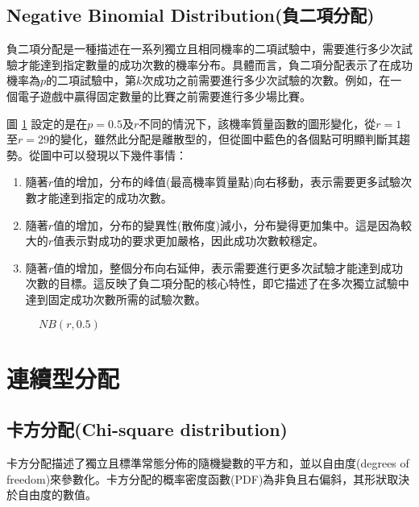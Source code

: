 \documentclass[12pt, a4paper]{article}
\begin{document}
\subsection{Negative Binomial Distribution(負二項分配)}
負二項分配是一種描述在一系列獨立且相同機率的二項試驗中，需要進行多少次試驗才能達到指定數量的成功次數的機率分布。具體而言，負二項分配表示了在成功機率為$p$的二項試驗中，第$k$次成功之前需要進行多少次試驗的次數。例如，在一個電子遊戲中贏得固定數量的比賽之前需要進行多少場比賽。

圖 \ref{fig:negativebinomial_r} 設定的是在$p=0.5$及$r$不同的情況下，該機率質量函數的圖形變化，從$r=1$至$r=29$的變化，雖然此分配是離散型的，但從圖中藍色的各個點可明顯判斷其趨勢。從圖中可以發現以下幾件事情：
\begin{enumerate}
\item 隨著$r$值的增加，分布的峰值(最高機率質量點)向右移動，表示需要更多試驗次數才能達到指定的成功次數。
\item 隨著$r$值的增加，分布的變異性(散佈度)減小，分布變得更加集中。這是因為較大的$r$值表示對成功的要求更加嚴格，因此成功次數較穩定。
\item 隨著$r$值的增加，整個分布向右延伸，表示需要進行更多次試驗才能達到成功次數的目標。這反映了負二項分配的核心特性，即它描述了在多次獨立試驗中達到固定成功次數所需的試驗次數。
\end{enumerate}
\begin{figure}[h]
    \caption{$NB(r,0.5)$}
    \label{fig:negativebinomial_r}
\end{figure}
\section{連續型分配}
\subsection{卡方分配(Chi-square distribution)}
卡方分配描述了獨立且標準常態分佈的隨機變數的平方和，並以自由度(degrees of freedom)來參數化。卡方分配的概率密度函數(PDF)為非負且右偏斜，其形狀取決於自由度的數值。
\end{document}

